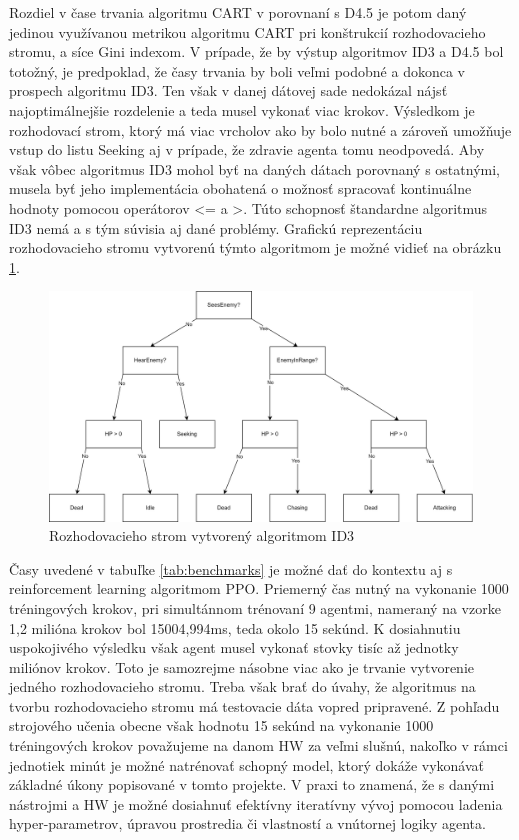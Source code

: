 \documentclass[slovak, master]{diploma}
\begin{document}
Rozdiel v čase trvania algoritmu CART v porovnaní s D4.5 je potom daný jedinou využívanou metrikou algoritmu CART pri konštrukcií rozhodovacieho stromu, a síce Gini indexom. V prípade, že by výstup algoritmov ID3 a D4.5 bol totožný, je predpoklad, že časy trvania by boli veľmi podobné a dokonca v prospech algoritmu ID3. Ten však v danej dátovej sade nedokázal nájsť najoptimálnejšie rozdelenie a teda musel vykonať viac krokov. Výsledkom je rozhodovací strom, ktorý má viac vrcholov ako by bolo nutné a zároveň umožňuje vstup do listu Seeking aj v prípade, že zdravie agenta tomu neodpovedá. Aby však vôbec algoritmus ID3 mohol byť na daných dátach porovnaný s ostatnými, musela byť jeho implementácia obohatená o možnosť spracovať kontinuálne hodnoty pomocou operátorov <= a >. Túto schopnosť štandardne algoritmus ID3 nemá a s tým súvisia aj dané problémy. Grafickú reprezentáciu rozhodovacieho stromu vytvorenú týmto algoritmom je možné vidieť na obrázku \ref{pic:treeGraphID3}.

\begin{figure}[!htbp]
    \centering
    \includegraphics[width=1\textwidth]{Figures/idTree.png}
    \caption{Rozhodovacieho strom vytvorený algoritmom ID3}
    \label{pic:treeGraphID3}
\end{figure}

Časy uvedené v tabuľke \ref{tab:benchmarks} je možné dať do kontextu aj s reinforcement learning algoritmom PPO. Priemerný čas nutný na vykonanie 1000 tréningových krokov, pri simultánnom trénovaní 9 agentmi, nameraný na vzorke 1,2 milióna krokov bol 15004,994ms, teda okolo 15 sekúnd. K dosiahnutiu uspokojivého výsledku však agent musel vykonať stovky tisíc až jednotky miliónov krokov. Toto je samozrejme násobne viac ako je trvanie vytvorenie jedného rozhodovacieho stromu. Treba však brať do úvahy, že algoritmus na tvorbu rozhodovacieho stromu má testovacie dáta vopred pripravené. Z pohľadu strojového učenia obecne však hodnotu 15 sekúnd na vykonanie 1000 tréningových krokov považujeme na danom HW za veľmi slušnú, nakoľko v rámci jednotiek minút je možné natrénovať schopný model, ktorý dokáže vykonávať základné úkony popisované v tomto projekte. V praxi to znamená, že s danými nástrojmi a HW je možné dosiahnuť efektívny iteratívny vývoj pomocou ladenia hyper-parametrov, úpravou prostredia či vlastností a vnútornej logiky agenta. 
\end{document}
